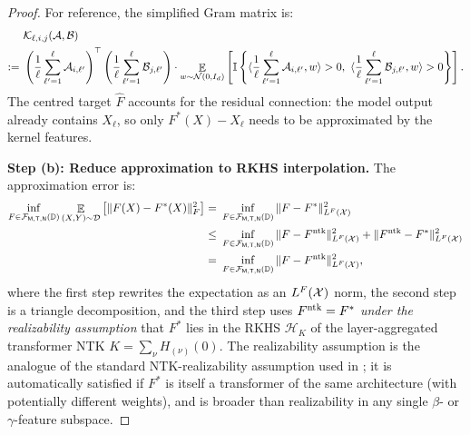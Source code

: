 \documentclass[11pt]{article}
\let\citet\citep
\theoremstyle{plain}
\newcommand{\wh}{\widehat}
\renewcommand{\hat}{\wh}
\DeclareMathOperator*{\E}{{\mathbb{E}}}
\begin{document}
\begin{proof}
    For reference, the simplified Gram matrix is:
    \begin{align*}
        & ~ {\cal K}_{\ell, i, j}({\cal A}, {\cal B}) \\
        := & ~  \left( \frac{1}{\ell} \sum_{\ell'=1}^{\ell} {\cal A}_{i, \ell'}\right)^\top \left( \frac{1}{\ell} \sum_{\ell'=1}^{\ell} {\cal B}_{j, \ell'} \right) \cdot \E_{w \sim {\cal N}(0, I_d)}\left[\mathbb{I} \left\{\langle \frac{1}{\ell} \sum_{\ell'=1}^{\ell} {\cal A}_{i, \ell'}, w \rangle > 0,\ \langle \frac{1}{\ell} \sum_{\ell'=1}^{\ell} {\cal B}_{j, \ell'}, w \rangle > 0 \right\} \right].
    \end{align*}
    The centred target $\hat F$ accounts for the residual connection: the model output already contains $X_\ell$, so only $F^*(X) - X_\ell$ needs to be approximated by the kernel features.

    {\bf Step (b): Reduce approximation to RKHS interpolation.} The approximation error is:
    \begin{align*}
        \inf_{F \in {\cal F}_{\sf M, T, N}(\mathbb{D})} \E_{(X, Y) \sim {\cal D}}\big[ \| F(X) - F^*(X)\|_F^2 \big]
        = & ~ \inf_{F \in {\cal F}_{\sf M, T, N}(\mathbb{D})}  \| F - F^*\|_{L^F({\cal X})}^2 \\
        \leq & ~ \inf_{F \in {\cal F}_{\sf M, T, N}(\mathbb{D})}  \| F - F^{\rm ntk}\|_{L^F({\cal X})}^2 + \| F^{\rm ntk} - F^*\|_{L^F({\cal X})}^2 \\
        = & ~ \inf_{F \in {\cal F}_{\sf M, T, N}(\mathbb{D})}  \| F - F^{\rm ntk}\|_{L^F({\cal X})}^2,
    \end{align*}
    where the first step rewrites the expectation as an $L^F({\cal X})$ norm, the second step is a triangle decomposition, and the third step uses $F^{\rm ntk} = F^*$ {\it under the realizability assumption} that $F^*$ lies in the RKHS $\mathcal{H}_K$ of the layer-aggregated transformer NTK $K = \sum_\nu H_{(\nu)}(0)$. The realizability assumption is the analogue of the standard NTK-realizability assumption used in \citet{adh+19, dzps19}; it is automatically satisfied if $F^*$ is itself a transformer of the same architecture (with potentially different weights), and is broader than realizability in any single $\beta$- or $\gamma$-feature subspace.


\end{proof}
\end{document}
